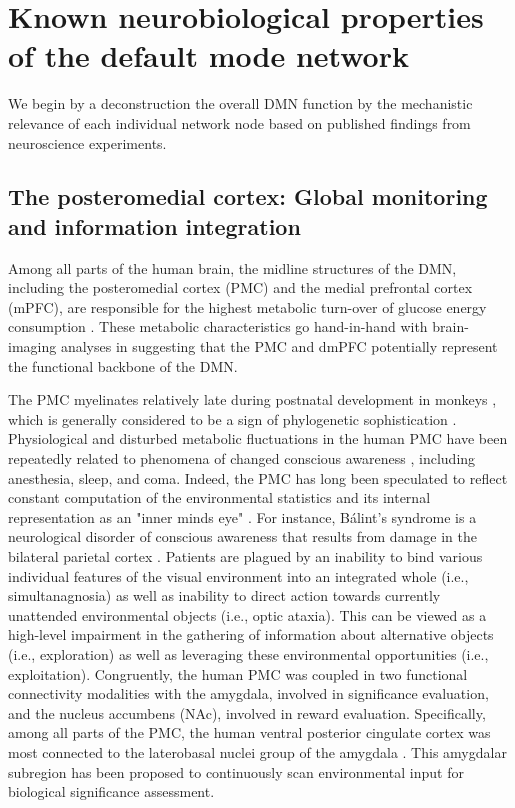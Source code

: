 \documentclass[10pt,letterpaper]{article}
\begin{document}
\section{Known neurobiological properties of the default mode network}
We begin by a deconstruction the overall DMN function
by the mechanistic relevance of each individual network node
based on published findings from neuroscience experiments.
%
\subsection{The posteromedial cortex: Global monitoring and information integration}
Among all parts of the human brain,
the midline structures of the DMN,
including the posteromedial cortex (PMC) and
the medial prefrontal cortex (mPFC),
are responsible for the highest metabolic turn-over
of glucose energy consumption \citep{raichle2001pnas}.
These metabolic characteristics go hand-in-hand with
brain-imaging analyses \citep{andrews2010} in
suggesting that the PMC and dmPFC
potentially represent the functional backbone of the DMN.


The PMC myelinates relatively late during postnatal development in monkeys
\citep{goldman1987development}, which is generally considered to
be a sign of phylogenetic sophistication \citep{flechsig1920}.
Physiological and disturbed metabolic fluctuations in the
human PMC have been repeatedly related to
phenomena of changed conscious awareness \citep{cavanna2006precuneus},
including anesthesia, sleep, and coma.
%
Indeed,
the PMC has long been speculated to reflect constant computation of
the environmental statistics and its internal representation
as an "inner minds eye" \citep{cavanna2006precuneus, leech_pcc2014}.
For instance, B\'alint's syndrome is a neurological disorder of conscious
awareness that results from damage in the bilateral parietal cortex
\citep{balint1909seelenlahmung}.
Patients are plagued by an
inability to bind various individual features of the visual
environment into an integrated whole (i.e., simultanagnosia)
as well as inability to direct action towards
currently unattended environmental objects
(i.e., optic ataxia).
This can be viewed as a high-level impairment in the gathering
of information about alternative objects (i.e., exploration) as well as
leveraging these environmental opportunities (i.e., exploitation).
Congruently,
the human PMC was coupled in two functional connectivity modalities
with the amygdala, involved in significance evaluation, and
the nucleus accumbens (NAc), involved in reward evaluation.
Specifically, among all parts of the PMC,
the human ventral posterior cingulate cortex was
most connected to the laterobasal
nuclei group of the amygdala
\citep{bzdok2015subspecialization}.
This amygdalar subregion has been proposed to
continuously scan environmental input
for biological significance assessment.
\end{document}
